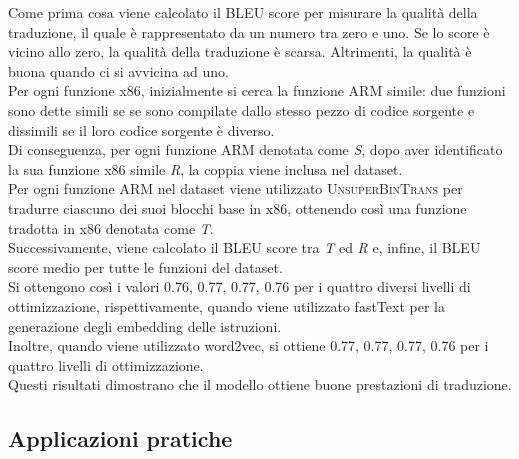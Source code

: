 \documentclass[12pt,a4paper,openright,twoside]{report}
\begin{document}
Come prima cosa viene calcolato il BLEU score per misurare la qualità della traduzione, il quale è rappresentato da un numero tra zero e uno. Se lo score è vicino allo zero, la qualità della traduzione è scarsa. Altrimenti, la qualità è buona quando ci si avvicina ad uno.\\
Per ogni funzione x86, inizialmente si cerca la funzione ARM simile: due funzioni sono dette simili se se sono compilate dallo stesso pezzo di codice sorgente e dissimili se il loro codice sorgente è diverso.\\
Di conseguenza, per ogni funzione ARM denotata come \textit{S}, dopo aver identificato la sua funzione x86 simile \textit{R}, la coppia viene inclusa nel dataset. \\Per ogni funzione ARM nel dataset viene utilizzato \textsc{UnsuperBinTrans} per tradurre ciascuno dei suoi blocchi base in x86, ottenendo così una funzione tradotta in x86 denotata come \textit{T}. \\Successivamente, viene calcolato il BLEU score tra \textit{T} ed \textit{R} e, infine, il BLEU score medio per tutte le funzioni del dataset.\\
Si ottengono così i valori 0.76, 0.77, 0.77, 0.76 per i quattro diversi livelli di ottimizzazione, rispettivamente, quando viene utilizzato fastText per la generazione degli embedding delle istruzioni. \\Inoltre, quando viene utilizzato word2vec, si ottiene 0.77, 0.77, 0.77, 0.76 per i quattro livelli di ottimizzazione.\\
Questi risultati dimostrano che il modello ottiene buone prestazioni di traduzione.

\subsection{Applicazioni pratiche}
\end{document}
